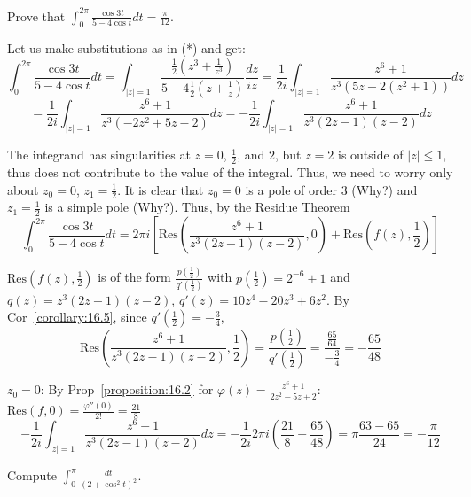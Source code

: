 \begin{example}\label{example:23.1}
    Prove that $\int_0^{2\pi} \frac{\cos 3t}{5-4 \cos t} dt = \frac{\pi}{12}$.
\end{example}
\begin{soln}
    Let us make substitutions as in (*) and get:
    \[
        \int_0^{2\pi} \frac{\cos 3t}{5-4 \cos t} dt = \int_{|z|=1} \frac{\frac{1}{2} (z^3 + \frac{1}{z^3})}{5-4 \frac{1}{2} (z + \frac{1}{z})} \frac{dz}{iz} = \frac{1}{2i} \int_{|z|=1} \frac{z^6 + 1}{z^3 (5z - 2(z^2 + 1))} dz
        \]
        \[
            = \frac{1}{2i} \int_{|z|=1} \frac{z^6 + 1}{z^3 (-2z^2 + 5z - 2)} dz = -\frac{1}{2i} \int_{|z|=1} \frac{z^6 + 1}{z^3 (2z - 1) (z - 2)} dz
            \]
            
            The integrand has singularities at $z=0$, $\frac{1}{2}$, and $2$, but $z=2$ is outside of $|z| \le 1$, thus does not contribute to the value of the integral. 
Thus, we need to worry only about $z_0 = 0$, $z_1 = \frac{1}{2}$. It is clear that $z_0 = 0$ is a pole of order 3 (Why?) and $z_1 = \frac{1}{2}$ is a simple pole (Why?). 
Thus, by the Residue Theorem
\[
\int_0^{2\pi} \frac{\cos 3t}{5-4 \cos t} dt = 2\pi i \left[ \text{Res} \left( \frac{z^6 + 1}{z^3 (2z - 1) (z - 2)}, 0 \right) + \text{Res} \left( f(z), \frac{1}{2} \right) \right]
\]

$\text{Res} \left( f(z), \frac{1}{2} \right)$ is of the form $\frac{p(\frac{1}{2})}{q'(\frac{1}{2})}$ with $p(\frac{1}{2}) = 2^{-6} + 1$ and $q(z) = z^3 (2z - 1) (z - 2)$, $q'(z) = 10z^4 - 20z^3 + 6z^2$. 
By Cor~\ref{corollary:16.5}, since $q'(\frac{1}{2}) = -\frac{3}{4}$,
\[
\text{Res} \left( \frac{z^6 + 1}{z^3 (2z - 1) (z - 2)}, \frac{1}{2} \right) = \frac{p(\frac{1}{2})}{q'(\frac{1}{2})} = \frac{\frac{65}{64}}{-\frac{3}{4}} = -\frac{65}{48}
\]

$z_0 = 0$: By Prop~\ref{proposition:16.2} for $\varphi(z) = \frac{z^6 + 1}{2z^2 - 5z + 2}$: $\text{Res} (f, 0) = \frac{\varphi''(0)}{2!} = \frac{21}{8}$
\[
    -\frac{1}{2i} \int_{|z|=1} \frac{z^6 + 1}{z^3 (2z - 1) (z - 2)} dz = -\frac{1}{2i} 2\pi i \left( \frac{21}{8} - \frac{65}{48} \right) = \pi \frac{63 - 65}{24} = -\frac{\pi}{12}
    \]
    
\end{soln}
\begin{example}\label{example:23.2}
    
    Compute $\int_0^{\pi} \frac{dt}{(2 + \cos^2 t)^2}$.
\end{example}
